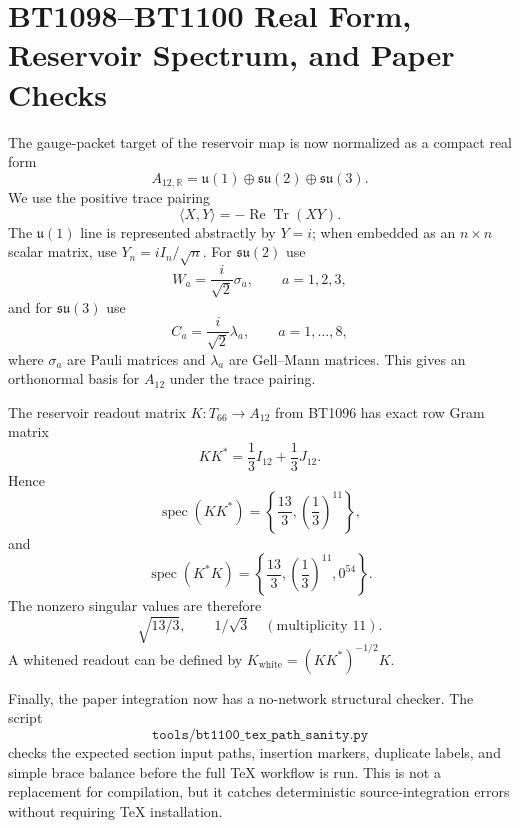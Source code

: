 \section{BT1098--BT1100 Real Form, Reservoir Spectrum, and Paper Checks}
\label{sec:bt1098-bt1100-realform-spectrum-ci}

The gauge-packet target of the reservoir map is now normalized as a compact real form
\[
A_{12,\mathbb R}=\mathfrak u(1)\oplus\mathfrak{su}(2)\oplus\mathfrak{su}(3).
\]
We use the positive trace pairing
\[
\langle X,Y\rangle=-\operatorname{Re}\operatorname{Tr}(XY).
\]
The $\mathfrak u(1)$ line is represented abstractly by $Y=i$; when embedded as an $n\times n$ scalar matrix, use $Y_n=iI_n/\sqrt n$.  For $\mathfrak{su}(2)$ use
\[
W_a=\frac{i}{\sqrt2}\sigma_a,
\qquad a=1,2,3,
\]
and for $\mathfrak{su}(3)$ use
\[
C_a=\frac{i}{\sqrt2}\lambda_a,
\qquad a=1,\ldots,8,
\]
where $\sigma_a$ are Pauli matrices and $\lambda_a$ are Gell--Mann matrices.  This gives an orthonormal basis for $A_{12}$ under the trace pairing.

The reservoir readout matrix $K:T_{66}\to A_{12}$ from BT1096 has exact row Gram matrix
\[
KK^*=\frac13 I_{12}+\frac13 J_{12}.
\]
Hence
\[
\operatorname{spec}(KK^*)=\left\{\frac{13}{3},\left(\frac13\right)^{11}\right\},
\]
and
\[
\operatorname{spec}(K^*K)=\left\{\frac{13}{3},\left(\frac13\right)^{11},0^{54}\right\}.
\]
The nonzero singular values are therefore
\[
\sqrt{13/3},\qquad 1/\sqrt3\quad(\text{multiplicity }11).
\]
A whitened readout can be defined by $K_{\mathrm{white}}=(KK^*)^{-1/2}K$.

Finally, the paper integration now has a no-network structural checker.  The script
\[
\texttt{tools/bt1100\_tex\_path\_sanity.py}
\]
checks the expected section input paths, insertion markers, duplicate labels, and simple brace balance before the full TeX workflow is run.  This is not a replacement for compilation, but it catches deterministic source-integration errors without requiring TeX installation.
